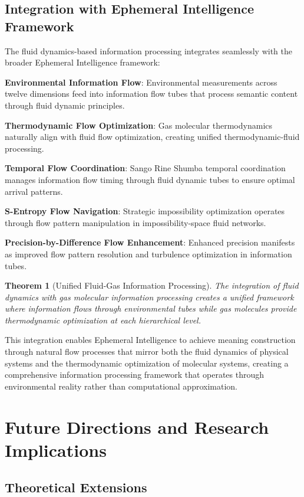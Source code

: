 \documentclass[12pt,a4paper]{article}
\newtheorem{theorem}{Theorem}
\begin{document}
\subsection{Integration with Ephemeral Intelligence Framework}

The fluid dynamics-based information processing integrates seamlessly with the broader Ephemeral Intelligence framework:

\textbf{Environmental Information Flow}:
Environmental measurements across twelve dimensions feed into information flow tubes that process semantic content through fluid dynamic principles.

\textbf{Thermodynamic Flow Optimization}:
Gas molecular thermodynamics naturally align with fluid flow optimization, creating unified thermodynamic-fluid processing.

\textbf{Temporal Flow Coordination}:
Sango Rine Shumba temporal coordination manages information flow timing through fluid dynamic tubes to ensure optimal arrival patterns.

\textbf{S-Entropy Flow Navigation}:
Strategic impossibility optimization operates through flow pattern manipulation in impossibility-space fluid networks.

\textbf{Precision-by-Difference Flow Enhancement}:
Enhanced precision manifests as improved flow pattern resolution and turbulence optimization in information tubes.

\begin{theorem}[Unified Fluid-Gas Information Processing]
The integration of fluid dynamics with gas molecular information processing creates a unified framework where information flows through environmental tubes while gas molecules provide thermodynamic optimization at each hierarchical level.
\end{theorem}

This integration enables Ephemeral Intelligence to achieve meaning construction through natural flow processes that mirror both the fluid dynamics of physical systems and the thermodynamic optimization of molecular systems, creating a comprehensive information processing framework that operates through environmental reality rather than computational approximation.

\section{Future Directions and Research Implications}

\subsection{Theoretical Extensions}
\end{document}
